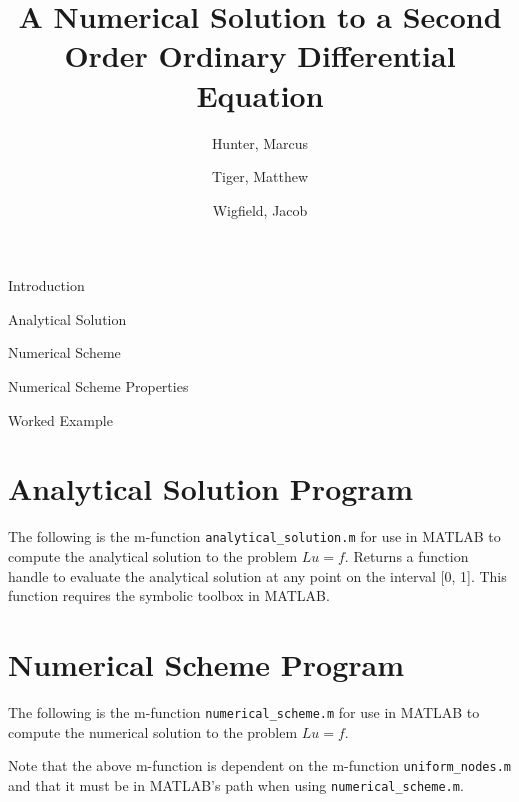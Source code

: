 \documentclass{article}
\title{
	{A Numerical Solution to a Second Order Ordinary Differential Equation}\\
}
\author{
	Hunter, Marcus \\
	\and
	Tiger, Matthew \\
	\and
	Wigfield, Jacob \\
}
\begin{document}
\maketitle
\newpage


\tableofcontents
\newpage


\begin{section}{Introduction}
  
\end{section}


\begin{section}{Analytical Solution}
  
\end{section}


\begin{section}{Numerical Scheme}\label{sec:scheme}
  
\end{section}


\begin{section}{Numerical Scheme Properties}\label{sec:scheme_prop}
  
\end{section}


\begin{section}{Worked Example}
  
\end{section}


\newpage
\begin{appendices}
  \section{Analytical Solution Program}\label{append_analytical}
  The following is the m-function \texttt{analytical\_solution.m} for use in
  MATLAB to compute the analytical solution to the problem $Lu = f$. Returns
  a function handle to evaluate the analytical solution at any point on the
  interval [0, 1]. This function requires the symbolic toolbox in MATLAB.
  

  \newpage
  \section{Numerical Scheme Program}\label{append_numerical}
  The following is the m-function \texttt{numerical\_scheme.m} for use in MATLAB
  to compute the numerical solution to the problem $Lu = f$.
  

  Note that the above m-function is dependent on the m-function
  \texttt{uniform\_nodes.m} and that it must be in MATLAB's path when using
  \texttt{numerical\_scheme.m}.
  
\end{appendices}
\end{document}
